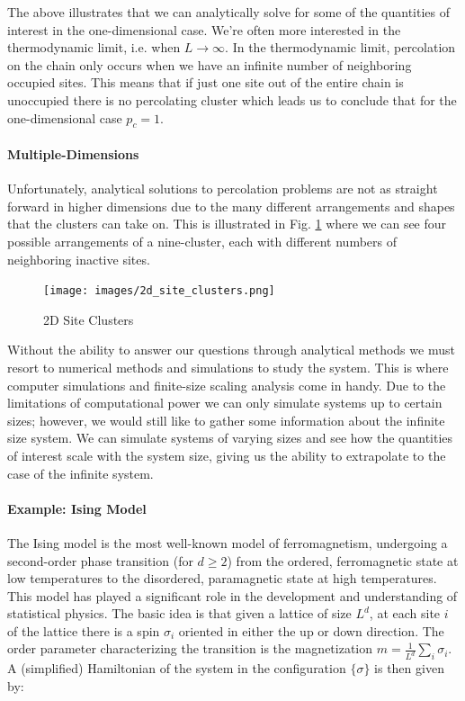 The above illustrates that we can analytically solve for some of the quantities of interest in the one-dimensional case.
We're often more interested in the thermodynamic limit, i.e. when $L \rightarrow \infty$.
In the thermodynamic limit, percolation on the chain only occurs when we have an infinite number of neighboring occupied sites.
This means that if just one site out of the entire chain is unoccupied there is no percolating cluster which leads us to conclude that for the one-dimensional case $p_c = 1$.

\paragraph{Multiple-Dimensions}
Unfortunately, analytical solutions to percolation problems are not as straight forward in higher dimensions due to the many different arrangements and shapes that the clusters can take on.
This is illustrated in Fig. \ref{fig:2d_site_clusters} where we can see four possible arrangements of a nine-cluster, each with different numbers of neighboring inactive sites.

\begin{figure}
	\centering
	\texttt{[image: images/2d\_site\_clusters.png]}
	\caption{2D Site Clusters}
	\label{fig:2d_site_clusters}
\end{figure}
Without the ability to answer our questions through analytical methods we must resort to numerical methods and simulations to study the system.
This is where computer simulations and finite-size scaling analysis come in handy.
Due to the limitations of computational power we can only simulate systems up to certain sizes; however, we would still like to gather some information about the infinite size system.
We can simulate systems of varying sizes and see how the quantities of interest scale with the system size, giving us the ability to extrapolate to the case of the infinite system.

\paragraph{Example: Ising Model}
The Ising model is the most well-known model of ferromagnetism, undergoing a second-order phase transition (for $d \ge 2$) from the ordered, ferromagnetic state at low temperatures to the disordered, paramagnetic state at high temperatures.
This model has played a significant role in the development and understanding of statistical physics.
The basic idea is that given a lattice of size $L^d$, at each site $i$ of the lattice there is a spin $\sigma_i$ oriented in either the up or down direction.
The order parameter characterizing the transition is the magnetization $m = \frac{1}{L^d} \sum_i \sigma_i$.
A (simplified) Hamiltonian of the system in the configuration $\{\sigma\}$ is then given by:

